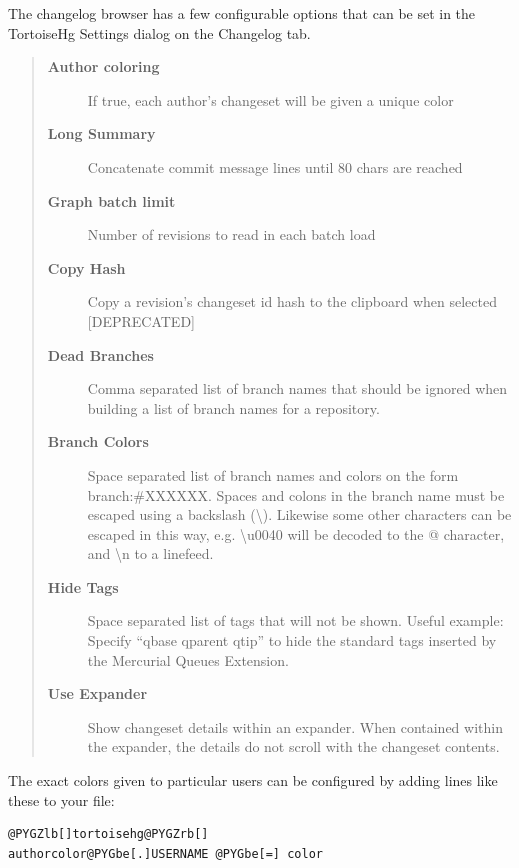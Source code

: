 \documentclass[letterpaper,10pt,english]{manual}
\begin{document}
The changelog browser has a few configurable options that can be set in
the TortoiseHg Settings dialog on the Changelog tab.
\begin{quote}
\begin{description}
\item[\textbf{Author coloring}]
If true, each author's changeset will be given a unique color

\item[\textbf{Long Summary}]
Concatenate commit message lines until 80 chars are reached

\item[\textbf{Graph batch limit}]
Number of revisions to read in each batch load

\item[\textbf{Copy Hash}]
Copy a revision's changeset id hash to the clipboard when selected
{[}DEPRECATED{]}

\item[\textbf{Dead Branches}]
Comma separated list of branch names that should be ignored
when building a list of branch names for a repository.

\item[\textbf{Branch Colors}]
Space separated list of branch names and colors on the
form branch:\#XXXXXX. Spaces and colons in the branch name must be
escaped using a backslash (\textbackslash{}). Likewise some other characters
can be escaped in this way, e.g. \textbackslash{}u0040 will be decoded to the
@ character, and \textbackslash{}n to a linefeed.

\item[\textbf{Hide Tags}]
Space separated list of tags that will not be shown.  Useful
example: Specify ``qbase qparent qtip'' to hide the standard tags
inserted by the Mercurial Queues Extension.

\item[\textbf{Use Expander}]
Show changeset details within an expander.  When contained
within the expander, the details do not scroll with the
changeset contents.

\end{description}
\end{quote}

The exact colors given to particular users can be configured by adding
lines like these to your  file:

\begin{Verbatim}[commandchars=@\[\]]
@PYGZlb[]tortoisehg@PYGZrb[]
authorcolor@PYGbe[.]USERNAME @PYGbe[=] color
\end{Verbatim}
\end{document}
